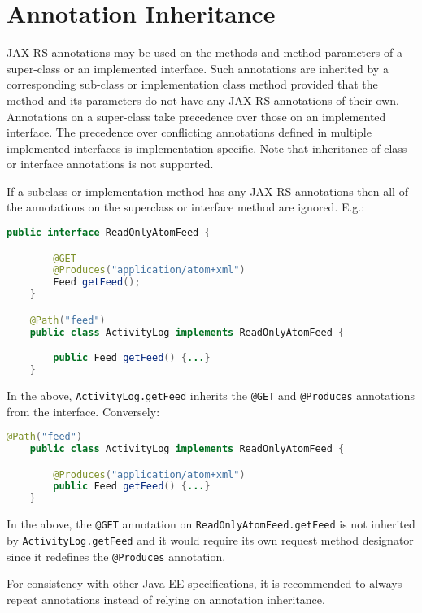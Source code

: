 \section{Annotation Inheritance}
\label{annotationinheritance}

\textcolor{highlight green}{JAX-RS annotations may be used on the methods and method parameters of a super-class or an
implemented interface. Such annotations are inherited by a corresponding sub-class or implementation class method
provided that the method and its parameters do not have any JAX-RS annotations of their own. Annotations on a
super-class take precedence over those on an implemented interface. The precedence over conflicting annotations defined
in multiple implemented interfaces is implementation specific. Note that inheritance of class or interface annotations
is not supported.}

If a subclass or implementation method has any JAX-RS annotations then all of the annotations on the superclass or
interface method are ignored. E.g.:

\begin{lstlisting}[language=Java]
    public interface ReadOnlyAtomFeed {

        @GET
        @Produces("application/atom+xml")
        Feed getFeed();
    }

    @Path("feed")
    public class ActivityLog implements ReadOnlyAtomFeed {

        public Feed getFeed() {...}
    }
\end{lstlisting}

In the above, \lstinline{ActivityLog.getFeed} inherits the \lstinline{@GET} and \lstinline{@Produces} annotations from
the interface. Conversely:

\begin{lstlisting}[language=Java]
    @Path("feed")
    public class ActivityLog implements ReadOnlyAtomFeed {

        @Produces("application/atom+xml")
        public Feed getFeed() {...}
    }
\end{lstlisting}

In the above, the \lstinline{@GET} annotation on \lstinline{ReadOnlyAtomFeed.getFeed} is not inherited by
\lstinline{ActivityLog.getFeed} and it would require its own request method designator since it redefines the
\lstinline{@Produces} annotation.

For consistency with other Java EE specifications, it is recommended to always repeat annotations instead of relying on
annotation inheritance.

